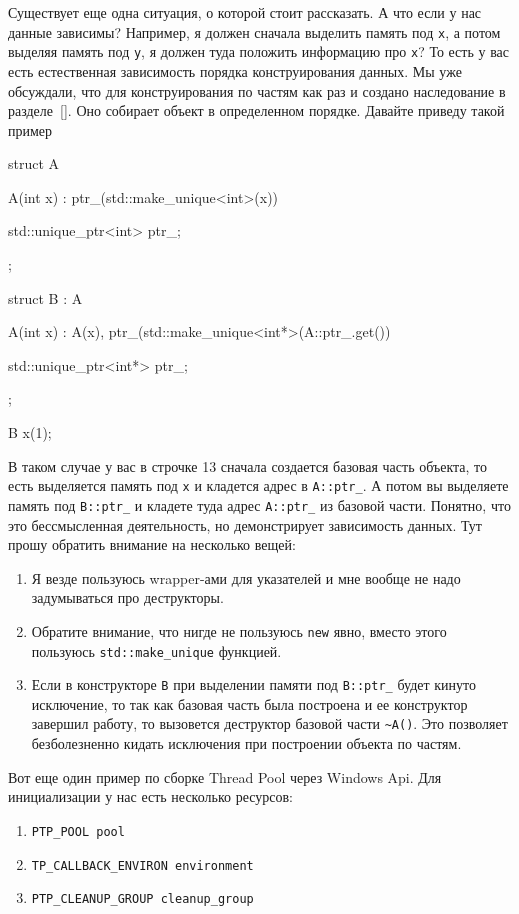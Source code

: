 Существует еще одна ситуация, о которой стоит рассказать.
А что если у нас данные зависимы?
Например, я должен сначала выделить память под \verb"x", а потом выделяя память под \verb"y", я должен туда положить информацию про \verb"x"?
То есть у вас есть естественная зависимость порядка конструирования данных.
Мы уже обсуждали, что для конструирования по частям как раз и создано наследование в разделе~\ref{}.
Оно собирает объект в определенном порядке.
Давайте приведу такой пример
\begin{cppcode}
struct A {
  A(int x) : ptr_(std::make_unique<int>(x)) {}
  
  std::unique_ptr<int> ptr_;
};

struct B : A {
  A(int x) : A(x), ptr_(std::make_unique<int*>(A::ptr_.get()) {}
     
   std::unique_ptr<int*> ptr_;
};

B x(1);
\end{cppcode}
В таком случае у вас в строчке 13 сначала создается базовая часть объекта, то есть выделяется память под \verb"x" и кладется адрес в \verb"A::ptr_".
А потом вы выделяете память под \verb"B::ptr_" и кладете туда адрес \verb"A::ptr_" из базовой части.
Понятно, что это бессмысленная деятельность, но демонстрирует зависимость данных.
Тут прошу обратить внимание на несколько вещей:
\begin{enumerate}
\item Я везде пользуюсь wrapper-ами для указателей и мне вообще не надо задумываться про деструкторы.

\item Обратите внимание, что нигде не пользуюсь \verb"new" явно, вместо этого пользуюсь \verb"std::make_unique" функцией.

\item Если в конструкторе \verb"B" при выделении памяти под \verb"B::ptr_" будет кинуто исключение, то так как базовая часть была построена и ее конструктор завершил работу, то вызовется деструктор базовой части \verb"~A()".
Это позволяет безболезненно кидать исключения при построении объекта по частям.
\end{enumerate}
Вот еще один пример по сборке Thread Pool через Windows Api.
Для инициализации у нас есть несколько ресурсов:
\begin{enumerate}
\item \verb"PTP_POOL pool"

\item \verb"TP_CALLBACK_ENVIRON environment"

\item \verb"PTP_CLEANUP_GROUP cleanup_group"
\end{enumerate}
